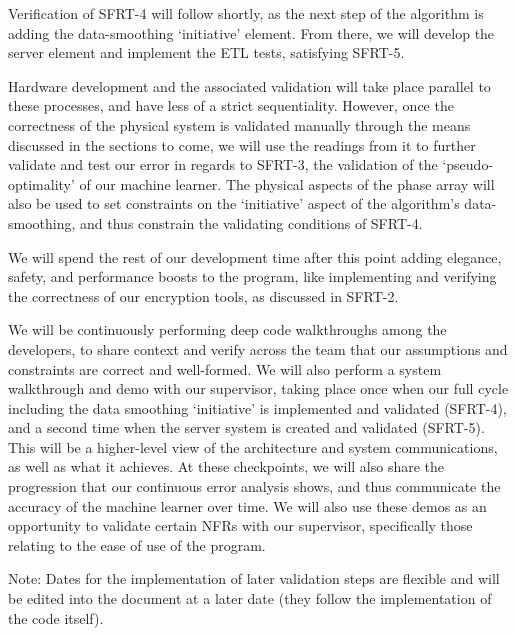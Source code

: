 \documentclass[12pt, titlepage]{article}
\begin{document}
Verification of SFRT-4 will follow shortly, as the next step of the algorithm is adding the data-smoothing ‘initiative’ element. From there, we will develop the server element and implement the ETL tests, satisfying SFRT-5. 

Hardware development and the associated validation will take place parallel to these processes, and have less of a strict sequentiality. However, once the correctness of the physical system is validated manually through the means discussed in the sections to come, we will use the readings from it to further validate and test our error in regards to SFRT-3, the validation of the ‘pseudo-optimality’ of our machine learner. The physical aspects of the phase array will also be used to set constraints on the ‘initiative’ aspect of the algorithm’s data-smoothing, and thus constrain the validating conditions of SFRT-4. 

We will spend the rest of our development time after this point adding elegance, safety, and performance boosts to the program, like implementing and verifying the correctness of our encryption tools, as discussed in SFRT-2.

We will be continuously performing deep code walkthroughs among the developers, to share context and verify across the team that our assumptions and constraints are correct and well-formed. We will also perform a system walkthrough and demo with our supervisor, taking place once when our full cycle including the data smoothing ‘initiative’ is implemented and validated (SFRT-4), and a second time when the server system is created and validated (SFRT-5). This will be a higher-level view of the architecture and system communications, as well as what it achieves. At these checkpoints, we will also share the progression that our continuous error analysis shows, and thus communicate the accuracy of the machine learner over time. We will also use these demos as an opportunity to validate certain NFRs with our supervisor, specifically those relating to the ease of use of the program.

\par

Note: Dates for the implementation of later validation steps are flexible and will be edited into the document at a later date (they follow the implementation of the code itself).
\end{document}
